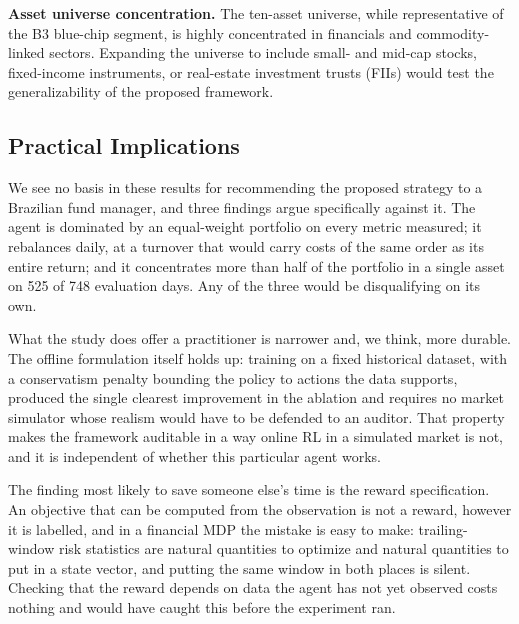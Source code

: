 \textbf{Asset universe concentration.}
The ten-asset universe, while representative of the B3 blue-chip segment, is
highly concentrated in financials and commodity-linked sectors.
Expanding the universe to include small- and mid-cap stocks, fixed-income
instruments, or real-estate investment trusts (FIIs) would test the
generalizability of the proposed framework.

\subsection{Practical Implications}
\label{subsec:disc_implications}

We see no basis in these results for recommending the proposed strategy to a
Brazilian fund manager, and three findings argue specifically against it.
The agent is dominated by an equal-weight portfolio on every metric measured; it
rebalances daily, at a turnover that would carry costs of the same order as its
entire return; and it concentrates more than half of the portfolio in a single
asset on 525 of 748 evaluation days.
Any of the three would be disqualifying on its own.

What the study does offer a practitioner is narrower and, we think, more durable.
The offline formulation itself holds up: training on a fixed historical dataset,
with a conservatism penalty bounding the policy to actions the data supports,
produced the single clearest improvement in the ablation and requires no market
simulator whose realism would have to be defended to an auditor.
That property makes the framework auditable in a way online RL in a simulated
market is not, and it is independent of whether this particular agent works.

The finding most likely to save someone else's time is the reward specification.
An objective that can be computed from the observation is not a reward, however it
is labelled, and in a financial MDP the mistake is easy to make: trailing-window
risk statistics are natural quantities to optimize and natural quantities to put
in a state vector, and putting the same window in both places is silent.
Checking that the reward depends on data the agent has not yet observed costs
nothing and would have caught this before the experiment ran.
